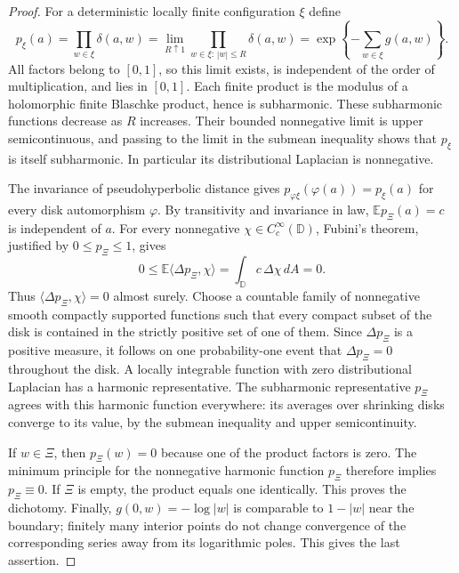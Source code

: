 \documentclass[11pt,a4paper]{article}
\numberwithin{equation}{section}
\theoremstyle{definition}
\theoremstyle{remark}
\newcommand{\E}{\mathbb E}
\begin{document}
\begin{proof}
For a deterministic locally finite configuration $\xi$ define
\[
 p_\xi(a)=\prod_{w\in\xi}\delta(a,w)
   =\lim_{R\uparrow1}\prod_{w\in\xi:\,|w|\le R}\delta(a,w)
   =\exp\left\{-\sum_{w\in\xi}g(a,w)\right\}.
\]
All factors belong to $[0,1]$, so this limit exists, is independent of
the order of multiplication, and lies in $[0,1]$. Each finite product is
the modulus of a holomorphic finite Blaschke product, hence is
subharmonic. These subharmonic functions decrease as $R$ increases.
Their bounded nonnegative limit is upper semicontinuous, and passing
to the limit in the submean inequality shows that $p_\xi$ is itself
subharmonic. In particular its distributional Laplacian is nonnegative.

The invariance of pseudohyperbolic distance gives
$p_{\varphi\xi}(\varphi(a))=p_\xi(a)$ for every disk automorphism
$\varphi$. By transitivity and invariance in law,
$\E p_\Xi(a)=c$ is independent of $a$. For every nonnegative
$\chi\in C_c^\infty(\mathbb D)$, Fubini's theorem, justified by
$0\le p_\Xi\le1$, gives
\[
 0\le \E\langle\Delta p_\Xi,\chi\rangle
   =\int_{\mathbb D}c\,\Delta\chi\,dA=0.
\]
Thus $\langle\Delta p_\Xi,\chi\rangle=0$ almost surely.
Choose a countable family of nonnegative smooth compactly supported
functions such that every compact subset of the disk is contained in
the strictly positive set of one of them. Since $\Delta p_\Xi$ is a
positive measure, it follows on one probability-one event that
$\Delta p_\Xi=0$ throughout the disk. A locally integrable function with
zero distributional Laplacian has a harmonic representative. The
subharmonic representative $p_\Xi$ agrees with this harmonic function
everywhere: its averages over shrinking disks converge to its value,
by the submean inequality and upper semicontinuity.

If $w\in\Xi$, then $p_\Xi(w)=0$ because one of the product factors is
zero. The minimum principle for the nonnegative harmonic function
$p_\Xi$ therefore implies $p_\Xi\equiv0$. If $\Xi$ is empty, the
product equals one identically. This proves the dichotomy. Finally,
$g(0,w)=-\log|w|$ is comparable to $1-|w|$ near the boundary; finitely
many interior points do not change convergence of the corresponding
series away from its logarithmic poles. This gives the last assertion.
\end{proof}
\end{document}
